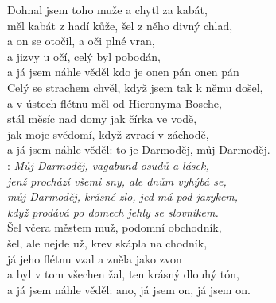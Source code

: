 \begin{large}

Dohnal jsem toho muže a chytl za kabát,\\
měl kabát z hadí kůže, šel z něho divný chlad,\\
a on se otočil, a oči plné vran,\\
a jizvy u očí, celý byl pobodán,\\
a já jsem náhle věděl kdo je onen pán onen pán\\

Celý se strachem chvěl, když jsem tak k němu došel,\\
a v ústech flétnu měl od Hieronyma Bosche,\\
stál měsíc nad domy jak čírka ve vodě,\\
jak moje svědomí, když zvrací v záchodě,\\
a já jsem náhle věděl: to je Darmoděj, můj Darmoděj.\\

\textregistered: \emph{Můj Darmoděj, vagabund osudů a lásek,\\
jenž prochází všemi sny, ale dnům vyhýbá se,\\
můj Darmoděj, krásné zlo, jed má pod jazykem,\\
když prodává po domech jehly se slovníkem.}\\

Šel včera městem muž, podomní obchodník,\\
šel, ale nejde už, krev skápla na chodník,\\
já jeho flétnu vzal a zněla jako zvon\\
a byl v tom všechen žal, ten krásný dlouhý tón,\\
a já jsem náhle věděl: ano, já jsem on, já jsem on. \hspace{1cm}
\textregistered

\end{large}

\newpage
